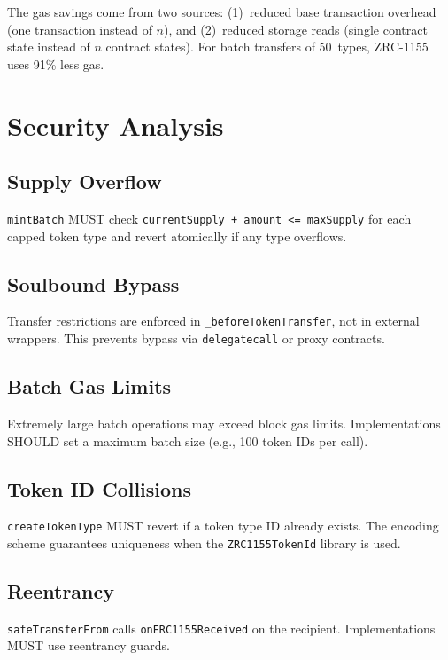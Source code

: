\documentclass[11pt,letterpaper]{article}
\begin{document}
The gas savings come from two sources: (1)~reduced base transaction overhead (one transaction instead of $n$), and (2)~reduced storage reads (single contract state instead of $n$ contract states). For batch transfers of 50~types, ZRC-1155 uses 91\% less gas.

\section{Security Analysis}

\subsection{Supply Overflow}

\texttt{mintBatch} MUST check \texttt{currentSupply + amount <= maxSupply} for each capped token type and revert atomically if any type overflows.

\subsection{Soulbound Bypass}

Transfer restrictions are enforced in \texttt{\_beforeTokenTransfer}, not in external wrappers. This prevents bypass via \texttt{delegatecall} or proxy contracts.

\subsection{Batch Gas Limits}

Extremely large batch operations may exceed block gas limits. Implementations SHOULD set a maximum batch size (e.g., 100 token IDs per call).

\subsection{Token ID Collisions}

\texttt{createTokenType} MUST revert if a token type ID already exists. The encoding scheme guarantees uniqueness when the \texttt{ZRC1155TokenId} library is used.

\subsection{Reentrancy}

\texttt{safeTransferFrom} calls \texttt{onERC1155Received} on the recipient. Implementations MUST use reentrancy guards.
\end{document}
